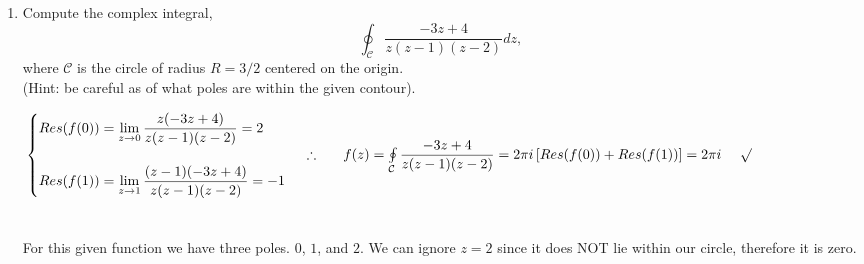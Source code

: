 \documentclass[fleqn]{article}
\begin{document}
\begin{enumerate}
    
    \item Compute the complex integral,
    $$ \oint_{\mathcal C} \frac{-3z + 4}{z(z-1)(z-2)} dz ,$$
    where ${\mathcal C}$ is the circle of radius $R=3/2$ centered on the origin. \\
    (Hint:  be careful as of what poles are within the given contour). 

      \textcolor{hwColor}{
        $
        \\
        \\
          \begin{cases}
            Res(f(0))=\lim\limits_{z \to 0} \dfrac{z(-3z+4)}{z(z-1)(z-2)}=2
            \\
            \\
            Res(f(1))=\lim\limits_{z \to 1} \dfrac{(z-1)(-3z+4)}{z(z-1)(z-2)}=-1
          \end{cases}
          \\
          \\
          \\
          \therefore ~~~~~ f(z)=\oint\limits_{\mathcal{C}} \dfrac{-3z+4}{z(z-1)(z-2)}=2\pi i \left[Res(f(0))+Res(f(1))\right]=2 \pi i ~~~~ \surd
        $
        \\
        \\
        \\
        For this given function we have three poles. $0$, $1$, and $2$. We can ignore $z=2$ since it does NOT lie
        within our circle, therefore it is zero.  
      }
    
  \end{enumerate}
\end{document}
